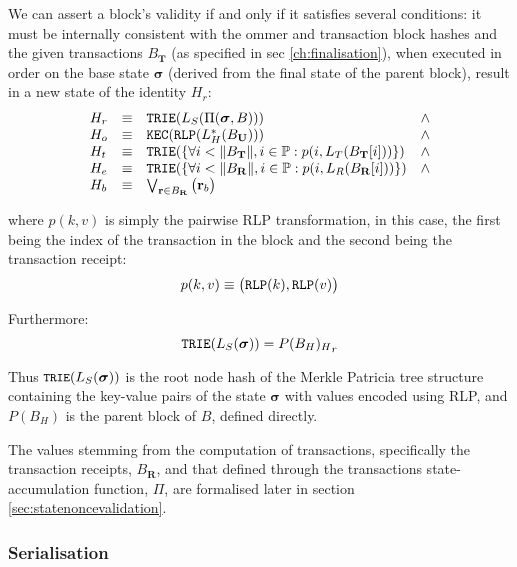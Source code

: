 \documentclass[9pt,oneside]{amsart}
\begin{document}
\begin{multicols}{2}
We can assert a block's validity if and only if it satisfies several conditions: it must be internally consistent with the ommer and transaction block hashes and the given transactions $B_\mathbf{T}$ (as specified in sec \ref{ch:finalisation}), when executed in order on the base state $\boldsymbol{\sigma}$ (derived from the final state of the parent block), result in a new state of the identity $H_r$:
\begin{equation}
\begin{array}[t]{lclc}
H_r &\equiv& \mathtt{\small TRIE}(L_S(\Pi(\boldsymbol{\sigma}, B))) & \wedge \\
H_o &\equiv& \mathtt{\small KEC}(\mathtt{\small RLP}(L_H^*(B_\mathbf{U}))) & \wedge \\
H_t &\equiv& \mathtt{\small TRIE}(\{\forall i < \lVert B_\mathbf{T} \rVert, i \in \mathbb{P}: p(i, L_T(B_\mathbf{T}[i]))\}) & \wedge \\
H_e &\equiv& \mathtt{\small TRIE}(\{\forall i < \lVert B_\mathbf{R} \rVert, i \in \mathbb{P}: p(i, L_R(B_\mathbf{R}[i]))\}) & \wedge \\
H_b &\equiv& \bigvee_{\mathbf{r} \in B_\mathbf{R}} \big( \mathbf{r}_b \big)
\end{array}
\end{equation}

where $p(k, v)$ is simply the pairwise RLP transformation, in this case, the first being the index of the transaction in the block and the second being the transaction receipt:
\begin{equation}
p(k, v) \equiv \big( \mathtt{\small RLP}(k), \mathtt{\small RLP}(v) \big)
\end{equation}

Furthermore:
\begin{equation}
\mathtt{\small TRIE}(L_S(\boldsymbol{\sigma})) = {P(B_H)_H}_r
\end{equation}

Thus $\texttt{\small TRIE}(L_S(\boldsymbol{\sigma}))$ is the root node hash of the Merkle Patricia tree structure containing the key-value pairs of the state $\boldsymbol{\sigma}$ with values encoded using RLP, and $P(B_H)$ is the parent block of $B$, defined directly.

The values stemming from the computation of transactions, specifically the transaction receipts, $B_\mathbf{R}$, and that defined through the transactions state-accumulation function, $\Pi$, are formalised later in section \ref{sec:statenoncevalidation}.

\subsubsection{Serialisation}


\end{multicols}
\end{document}
